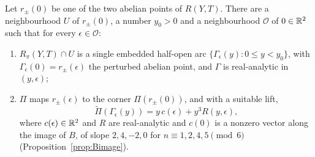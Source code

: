 \begin{lemma}\label{lem:cornerchart}
Let $r_\pm(0)$ be one of the two abelian points of $R(Y,T)$. There are a neighbourhood $U$ of $r_\pm(0)$, a number
$y_0>0$ and a neighbourhood $\mathcal O$ of $0\in\mathbb{R}^2$ such that for every $\epsilon\in\mathcal O$:
\begin{enumerate}
\item $R_\pi(Y,T)\cap U$ is a single embedded half-open arc $\{\Gamma_\epsilon(y):0\le y<y_0\}$, with
$\Gamma_\epsilon(0)=r_\pm(\epsilon)$ the perturbed abelian point, and $\Gamma$ is real-analytic in $(y,\epsilon)$;
\item $\Pi$ maps $r_\pm(\epsilon)$ to the corner $\Pi(r_\pm(0))$, and with a suitable lift,
$$\widetilde\Pi(\Gamma_\epsilon(y))=y\,c(\epsilon)+y^3R(y,\epsilon),$$
where $c(\epsilon)\in\mathbb{R}^2$ and $R$ are real-analytic and $c(0)$ is a nonzero vector along the image of $B$, of
slope $2,4,-2,0$ for $n\equiv1,2,4,5\pmod 6$ (Proposition~\ref{prop:Bimage}).
\end{enumerate}
\end{lemma}

